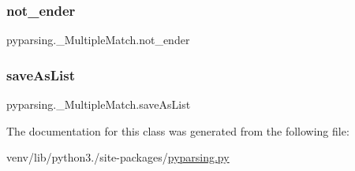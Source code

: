 \subsubsection{\texorpdfstring{not\+\_\+ender}{not\_ender}}
{\footnotesize\ttfamily pyparsing.\+\_\+\+Multiple\+Match.\+not\+\_\+ender}

\mbox{\label{classpyparsing_1_1__MultipleMatch_adc807675178ada8ed40333dbe98a5a1e}} 
\subsubsection{\texorpdfstring{save\+As\+List}{saveAsList}}
{\footnotesize\ttfamily pyparsing.\+\_\+\+Multiple\+Match.\+save\+As\+List}



The documentation for this class was generated from the following file\+:\begin{DoxyCompactItemize}
\item 
venv/lib/python3./site-\/packages/\hyperlink{pyparsing_8py}{pyparsing.\+py}\end{DoxyCompactItemize}
